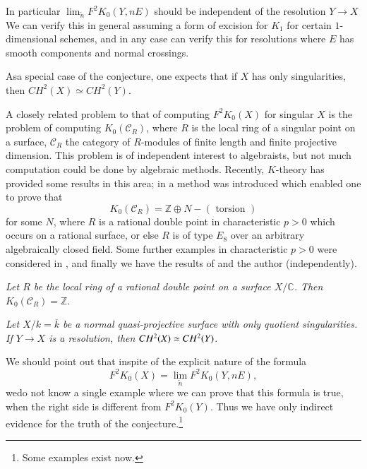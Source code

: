 In particular  $\displaystyle\mathop{\lim}_{\overleftarrow{n}} F^{2}K_0(Y, nE)$ should be independent of the resolution $Y\to X$ We can verify this in general assuming a form of excision for $K_1$ for certain $1$-dimensional schemes, and in any case can verify this for resolutions where $E$ has smooth components and normal crossings. 

As\pageoriginale a special case of the conjecture, one expects that if $X$ has only singularities, then $CH^{2}(X)\simeq CH^{2}(Y)$. 

A closely related problem to that of computing $F^{2}K_0(X)$ for singular $X$ is the problem of computing $K_0(\mathscr{C}_R)$, where $R$ is the local ring of a singular point on a surface, $\mathscr{C}_R$ the category of $R$-modules of finite length and finite projective dimension. This problem is of independent interest to algebraists, but not much computation could be done by algebraic methods. Recently, $K$-theory has provided some results in this area; in \cite{Srinivasb} a method was introduced which enabled one to prove that 
$$
K_0(\mathscr{C}_R)=\mathbb{Z} \oplus N-(\text{ torsion })
$$
for some $N$, where $R$ is a rational double point in characteristic $p>0$ which occurs on a rational surface, or else $R$ is of type $E_8$ over an arbitrary algebraically closed field. Some further examples in characteristic $p>0$ were considered in \cite{Coombes}, and finally we have the results of \cite{Levinec} and the author \cite{Srinivasc} (independently). 

\begin{thm1}
\textit{Let $R$ be the local ring of a rational double point on a surface $X/\mathbb{C}$. Then $K_0(\mathscr{C}_R)=\mathbb{Z}$}. 
\end{thm1}

\begin{cor}
\textit{Let $X/k=\overline{k}$ be a normal quasi-projective surface with only quotient singularities. If $Y\to X$ is a resolution, then $CH^{2}(X)\simeq CH^{2}\\(Y)$}.
\end{cor}

We should point out that inspite of the explicit nature of the formula
$$
F^{2}K_0(X)=\displaystyle\mathop{\lim}_{\overleftarrow{n}} F^{2}K_0(Y, nE), 
$$
we\pageoriginale do not know a single example where we can prove that this formula is true, when the right side is different from $F^{2}K_0(Y)$. Thus we have only indirect evidence for the truth of the conjecture.\footnote{Some examples exist now.}

